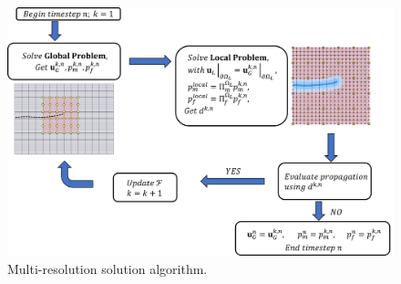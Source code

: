 \begin{figure}[h]
    \centering
    \includegraphics[width=\linewidth]{img/Section2/algorithm_fancy.png}
    \caption{Multi-resolution solution algorithm.}
    \label{fig:solution_algorithm}
\end{figure}
